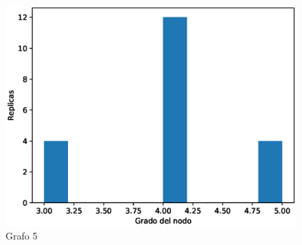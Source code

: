 \documentclass{article}
\begin{document}
\begin{figure}[H]
    \includegraphics[scale=0.6]{hist-grados-5}
    \caption{Grafo 5}
    \label{fig:matriz}
\end{figure}
\end{document}
